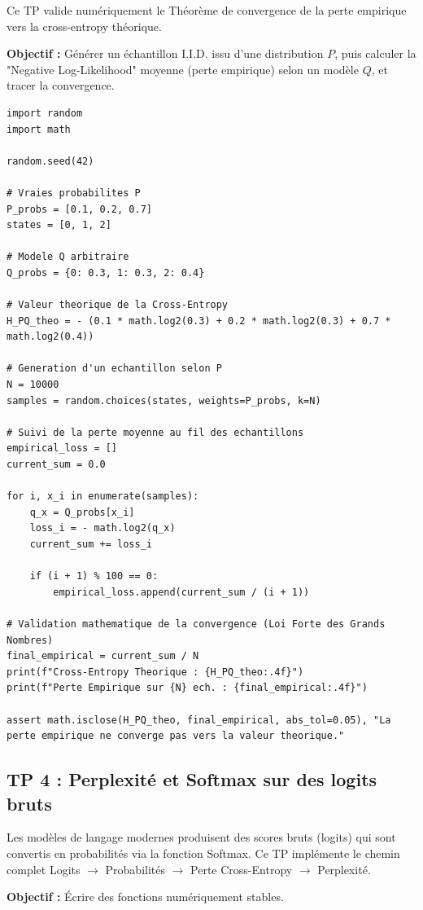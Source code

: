 \documentclass[11pt,a4paper]{article}
\begin{document}
Ce TP valide numériquement le Théorème de convergence de la perte empirique vers la cross-entropy théorique.

\textbf{Objectif :}
Générer un échantillon I.I.D. issu d'une distribution $P$, puis calculer la "Negative Log-Likelihood" moyenne (perte empirique) selon un modèle $Q$, et tracer la convergence.

\begin{lstlisting}
import random
import math

random.seed(42)

# Vraies probabilites P
P_probs = [0.1, 0.2, 0.7]
states = [0, 1, 2]

# Modele Q arbitraire
Q_probs = {0: 0.3, 1: 0.3, 2: 0.4}

# Valeur theorique de la Cross-Entropy
H_PQ_theo = - (0.1 * math.log2(0.3) + 0.2 * math.log2(0.3) + 0.7 * math.log2(0.4))

# Generation d'un echantillon selon P
N = 10000
samples = random.choices(states, weights=P_probs, k=N)

# Suivi de la perte moyenne au fil des echantillons
empirical_loss = []
current_sum = 0.0

for i, x_i in enumerate(samples):
    q_x = Q_probs[x_i]
    loss_i = - math.log2(q_x)
    current_sum += loss_i

    if (i + 1) % 100 == 0:
        empirical_loss.append(current_sum / (i + 1))

# Validation mathematique de la convergence (Loi Forte des Grands Nombres)
final_empirical = current_sum / N
print(f"Cross-Entropy Theorique : {H_PQ_theo:.4f}")
print(f"Perte Empirique sur {N} ech. : {final_empirical:.4f}")

assert math.isclose(H_PQ_theo, final_empirical, abs_tol=0.05), "La perte empirique ne converge pas vers la valeur theorique."
\end{lstlisting}


\subsection*{TP 4 : Perplexité et Softmax sur des logits bruts }


Les modèles de langage modernes produisent des scores bruts (logits) qui sont convertis en probabilités via la fonction Softmax.
Ce TP implémente le chemin complet Logits $\to$ Probabilités $\to$ Perte Cross-Entropy $\to$ Perplexité.

\textbf{Objectif :}
Écrire des fonctions numériquement stables.
\end{document}
